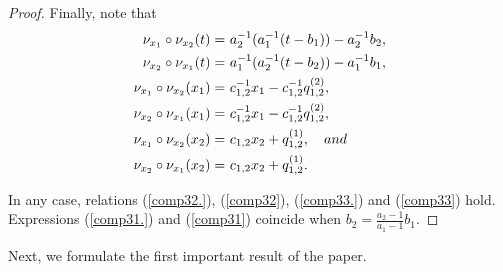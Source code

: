 \documentclass{amsart}
\theoremstyle{definition}
\theoremstyle{remark}
\numberwithin{equation}{section}
\begin{document}
\begin{proof}
Finally, note that 
\begin{align}
    \nu_{x_1} \circ \nu_{x_2}(t) = &\ a_2^{-1}(a_1^{-1}(t-b_1))-a_2^{-1}b_2, \label{comp31.}\\ 
    \nu_{x_2} \circ \nu_{x_1}(t) = &\ a_1^{-1}(a_2^{-1}(t-b_2))-a_1^{-1}b_1, \label{comp31} \\
    \nu_{x_1} \circ \nu_{x_2}(x_1) = &\ c_{1,2}^{-1}x_1-c_{1,2}^{-1}q_{1,2}^{(2)}, \label{comp32.}\\
    \nu_{x_2} \circ \nu_{x_1}(x_1) = &\ c_{1,2}^{-1}x_1-c_{1,2}^{-1}q_{1,2}^{(2)}, \label{comp32} \\
    \nu_{x_1} \circ \nu_{x_2}(x_2) = &\ c_{1,2}x_2+q_{1,2}^{(1)}, \label{comp33.} \quad {\rm and} \\
    \nu_{x_2} \circ \nu_{x_1}(x_2) = &\ c_{1,2}x_2 + q_{1,2}^{(1)}.\label{comp33}
\end{align}

In any case, relations {\rm (}\ref{comp32.}{\rm )}, {\rm (}\ref{comp32}{\rm )}, {\rm (}\ref{comp33.}{\rm )} and {\rm (}\ref{comp33}{\rm )} hold. Expressions {\rm (}\ref{comp31.}{\rm )} and  {\rm (}\ref{comp31}{\rm )} coincide when $b_2 = \frac{a_2-1}{a_1-1}b_1$. 
\end{proof}

Next, we formulate the first important result of the paper.
\end{document}
